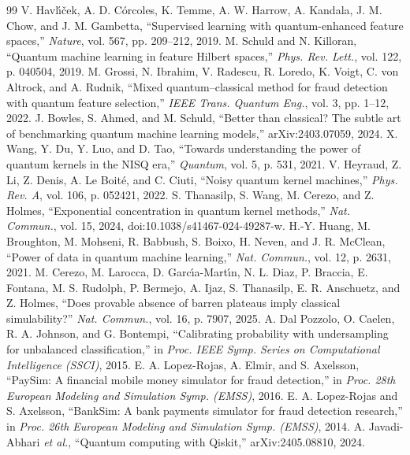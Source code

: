 \documentclass[conference,compsoc]{IEEEtran}
\begin{document}

\begin{thebibliography}{99}
 V. Havl\'{\i}\v{c}ek, A. D. C\'orcoles, K. Temme, A. W. Harrow, A. Kandala, J. M. Chow, and J. M. Gambetta, ``Supervised learning with quantum-enhanced feature spaces,'' \emph{Nature}, vol. 567, pp. 209--212, 2019.
 M. Schuld and N. Killoran, ``Quantum machine learning in feature Hilbert spaces,'' \emph{Phys. Rev. Lett.}, vol. 122, p. 040504, 2019.
 M. Grossi, N. Ibrahim, V. Radescu, R. Loredo, K. Voigt, C. von Altrock, and A. Rudnik, ``Mixed quantum--classical method for fraud detection with quantum feature selection,'' \emph{IEEE Trans. Quantum Eng.}, vol. 3, pp. 1--12, 2022.
 J. Bowles, S. Ahmed, and M. Schuld, ``Better than classical? The subtle art of benchmarking quantum machine learning models,'' arXiv:2403.07059, 2024.
 X. Wang, Y. Du, Y. Luo, and D. Tao, ``Towards understanding the power of quantum kernels in the NISQ era,'' \emph{Quantum}, vol. 5, p. 531, 2021.
 V. Heyraud, Z. Li, Z. Denis, A. Le Boit\'e, and C. Ciuti, ``Noisy quantum kernel machines,'' \emph{Phys. Rev. A}, vol. 106, p. 052421, 2022.
 S. Thanasilp, S. Wang, M. Cerezo, and Z. Holmes, ``Exponential concentration in quantum kernel methods,'' \emph{Nat. Commun.}, vol. 15, 2024, doi:10.1038/s41467-024-49287-w.
 H.-Y. Huang, M. Broughton, M. Mohseni, R. Babbush, S. Boixo, H. Neven, and J. R. McClean, ``Power of data in quantum machine learning,'' \emph{Nat. Commun.}, vol. 12, p. 2631, 2021.
 M. Cerezo, M. Larocca, D. Garc\'{\i}a-Mart\'{\i}n, N. L. Diaz, P. Braccia, E. Fontana, M. S. Rudolph, P. Bermejo, A. Ijaz, S. Thanasilp, E. R. Anschuetz, and Z. Holmes, ``Does provable absence of barren plateaus imply classical simulability?'' \emph{Nat. Commun.}, vol. 16, p. 7907, 2025.
 A. Dal Pozzolo, O. Caelen, R. A. Johnson, and G. Bontempi, ``Calibrating probability with undersampling for unbalanced classification,'' in \emph{Proc. IEEE Symp. Series on Computational Intelligence (SSCI)}, 2015.
 E. A. Lopez-Rojas, A. Elmir, and S. Axelsson, ``PaySim: A financial mobile money simulator for fraud detection,'' in \emph{Proc. 28th European Modeling and Simulation Symp. (EMSS)}, 2016.
 E. A. Lopez-Rojas and S. Axelsson, ``BankSim: A bank payments simulator for fraud detection research,'' in \emph{Proc. 26th European Modeling and Simulation Symp. (EMSS)}, 2014.
 A. Javadi-Abhari \emph{et al.}, ``Quantum computing with Qiskit,'' arXiv:2405.08810, 2024.
\end{thebibliography}
\end{document}
